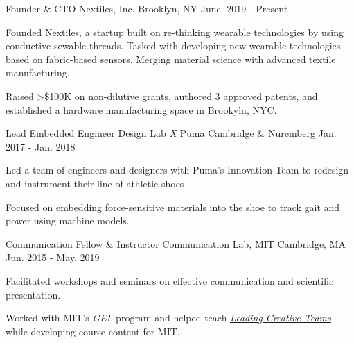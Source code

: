 
\newcommand{\patents}{3}
\newcommand{\raised}{100K}

\begin{cventries}

\cventry
    {Founder \& CTO} %
    {Nextiles, Inc.} %
    {Brooklyn, NY} %
    {June. 2019 - Present} %
    {
      \begin{cvitems} %
        \item {Founded \href{www.Nextiles.tech}{Nextiles}, a startup built on re-thinking wearable technologies by using conductive sewable threads. Tasked with developing new wearable technologies based on fabric-based sensors.
        Merging material science with advanced textile manufacturing.}
        \item {Raised >\$\raised{} on non-dilutive grants, authored \patents{} approved patents, and established a hardware manufacturing space in Brookyln, NYC.}
      \end{cvitems}
    }

 \cventry
    {Lead Embedded Engineer} %
    {Design Lab \textit{X} Puma} %
    {Cambridge \& Nuremberg} %
    {Jan. 2017 - Jan. 2018} %
    {
      \begin{cvitems} %
        \item {Led a team of engineers and designers with Puma's Innovation Team to redesign and instrument their line of athletic shoes}
        \item {Focused on embedding force-sensitive materials into the shoe to track gait and power using machine models.}
      \end{cvitems}
    }

  \cventry
    {Communication Fellow \& Instructor} %
    {Communication Lab, MIT} %
    {Cambridge, MA} %
    {Jun. 2015 - May. 2019} %
    {
      \begin{cvitems} %
        \item {Facilitated workshops and seminars on effective communication and scientific presentation.}
        \item {Worked with MIT's \textit{GEL} program and helped teach \href{Leading Creative Teams}{\textit{Leading Creative Teams}} while developing course content for MIT.}
      \end{cvitems}
    }
\end{cventries}
